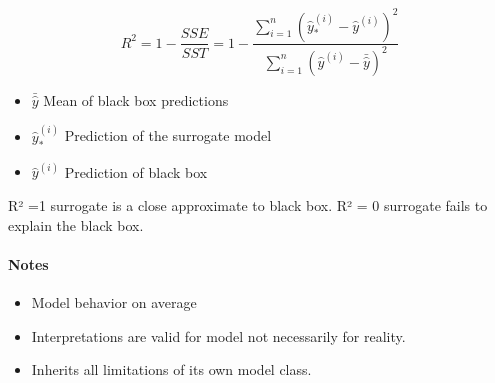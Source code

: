 \begin{equation}
	R^2=1 - \frac{SSE}{SST} = 1 - \frac{\sum_{i=1}^n (\hat{y}_*^{(i)} - \hat{y}^{(i)})^2}{\sum_{i=1}^n (\hat{y}^{(i)} - \bar{\hat{y}})^2}
	\label{eq:r²}
\end{equation}
\begin{itemize}
	\item $\bar{\hat{y}}$ Mean of black box predictions
	\item $\hat{y}_*^{(i)}$ Prediction of the surrogate model
	\item $\hat{y}^{(i)}$ Prediction of black box
\end{itemize}
R² =1 surrogate is a close approximate to black box. R² = 0 surrogate fails to explain the black box.

\paragraph{Notes}
\begin{itemize}
	\item Model behavior on average
	\item Interpretations are valid for model not necessarily for reality.
	\item Inherits all limitations of its own model class.
\end{itemize}
